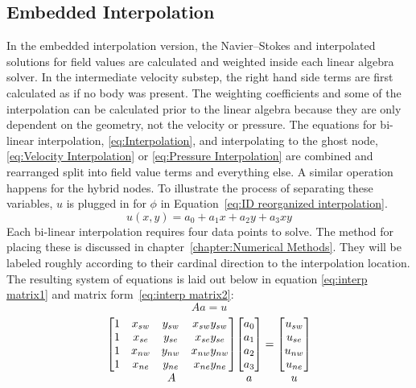 \subsection{Embedded Interpolation}
\label{sec:ID embedded}
In the embedded interpolation version, the Navier--Stokes and interpolated solutions for field values are calculated and weighted inside each linear algebra solver. 
In the intermediate velocity substep, the right hand side terms are first calculated as if no body was present. 
The weighting coefficients and some of the interpolation can be calculated prior to the linear algebra because they are only dependent on the geometry, not the velocity or pressure. 
The equations for bi-linear interpolation, \eqref{eq:Interpolation}, and interpolating to the ghost node, \eqref{eq:Velocity Interpolation} or \eqref{eq:Pressure Interpolation} are combined and rearranged split into field value terms and everything else. 
A similar operation happens for the hybrid nodes. 
To illustrate the process of separating these variables, $u$ is plugged in for $\phi$ in Equation~\eqref{eq:ID reorganized interpolation}. 
\begin{equation}
u(x,y) = a_0 + a_1x +a_2y+a_3xy
\end{equation}
Each bi-linear interpolation requires four data points to solve. 
The method for placing these is discussed in chapter~\ref{chapter:Numerical Methods}. 
They will be labeled roughly according to their cardinal direction to the interpolation location. 
The resulting system of equations is laid out below in equation \eqref{eq:interp matrix1} and matrix form~\eqref{eq:interp matrix2}:
\begin{equation}
Aa=u \label{eq:interp matrix1}
\end{equation}
\begin{gather}
{\mathop{
\begin{bmatrix}
		  1&x_{sw}&y_{sw}&x_{sw}y_{sw}\\
		  1&x_{se}&y_{se}&x_{se}y_{se}\\
		  1&x_{nw}&y_{nw}&x_{nw}y_{nw}\\
		  1&x_{ne}&y_{ne}&x_{ne}y_{ne}
\end{bmatrix}
}_{\textstyle A}}
{\mathop{
\begin{bmatrix}
	a_0\\
	a_1\\
	a_2\\
	a_3
\end{bmatrix}
}_{\textstyle a\vphantom{A}}}
=
{\mathop{
\begin{bmatrix}
	u_{sw}\\
	u_{se}\\
	u_{nw}\\
	u_{ne}
\end{bmatrix}
}_{\textstyle u\vphantom{A}}}
\label{eq:interp matrix2}
\end{gather}
